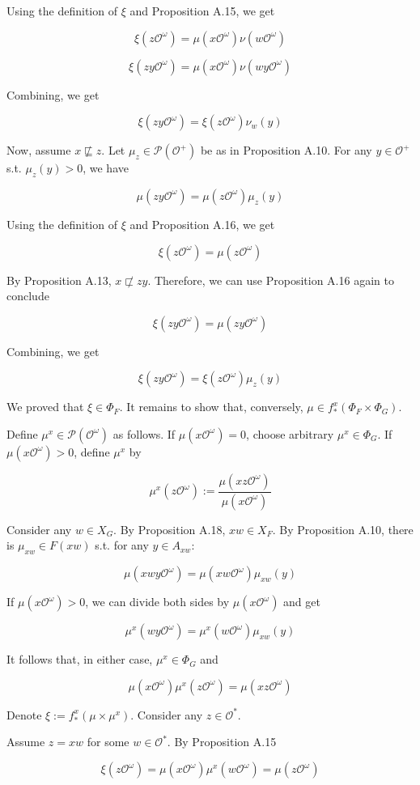 \documentclass[a4paper]{article}
\newcommand{\Prob}{\mathcal{P}}
\newcommand{\Obs}{\mathcal{O}}
\newcommand{\ObsO}{\Obs^\omega}
\begin{document}
Using the definition of ${\xi}$ and Proposition A.15, we get

$${\xi(z\ObsO)=\mu(x\ObsO) \nu(w\ObsO)}$$

$$\xi(zy\ObsO) = \mu(x\ObsO) \nu(wy\ObsO)$$

Combining, we get

$$\xi(zy\ObsO) = \xi(z\ObsO) \nu_w(y)$$

Now, assume ${x \not\sqsubseteq z}$. Let ${\mu_z \in \Prob(\Obs^+)}$ be as in Proposition A.10. For any ${y \in \Obs^+}$ s.t. ${\mu_z(y) > 0}$, we have

$$\mu(zy\ObsO)=\mu(z\ObsO) \mu_z(y)$$

Using the definition of ${\xi}$ and Proposition A.16, we get

$$\xi(z\ObsO)=\mu(z\ObsO)$$

By Proposition A.13, ${x \not\sqsubset zy}$. Therefore, we can use Proposition A.16 again to conclude

$$\xi(zy\ObsO)=\mu(zy\ObsO)$$

Combining, we get

$$\xi(zy\ObsO) = \xi(z\ObsO) \mu_z(y)$$

We proved that ${\xi \in \Phi_F}$. It remains to show that, conversely, ${\mu \in f_*^x(\Phi_F \times \Phi_G)}$. 

Define ${\mu^x \in \Prob(\ObsO)}$ as follows. If ${\mu(x\ObsO)=0}$, choose arbitrary ${\mu^x \in \Phi_G}$. If ${\mu(x\ObsO) > 0}$, define ${\mu^x}$ by 

$${\mu^x(z\ObsO):=\frac{\mu(xz\ObsO)}{\mu(x\ObsO)}}$$

Consider any ${w \in X_G}$. By Proposition A.18, ${xw \in X_F}$. By Proposition A.10, there is ${\mu_{xw} \in F(xw)}$ s.t. for any ${y \in A_{xw}}$:

$$\mu(xwy\ObsO)=\mu(xw\ObsO)\mu_{xw}(y)$$

If ${\mu(x\ObsO) > 0}$, we can divide both sides by $\mu(x\ObsO)$ and get

$$\mu^x(wy\ObsO)=\mu^x(w\ObsO)\mu_{xw}(y)$$

It follows that, in either case, ${\mu^x \in \Phi_G}$ and 

$$\mu(x\ObsO)\mu^x(z\ObsO)=\mu(xz\ObsO)$$

Denote ${\xi := f^x_*(\mu \times \mu^x)}$. Consider any ${z \in \Obs^*}$.

Assume ${z = xw}$ for some ${w \in \Obs^*}$. By Proposition A.15

$$\xi(z\ObsO) = \mu(x\ObsO)\mu^x(w\ObsO)=\mu(z\ObsO)$$
\end{document}
